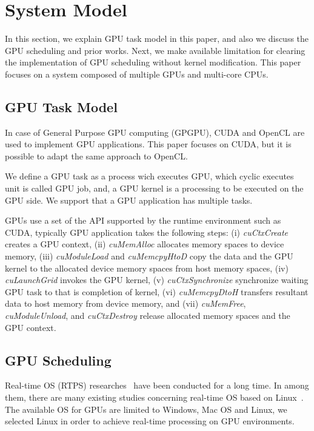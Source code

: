 \section{System Model}\label{sec:system_model}
In this section, we explain GPU task model in this paper, and also we discuss the GPU scheduling and prior works.
Next, we make available limitation for clearing the implementation of GPU scheduling without kernel modification.
This paper focuses on a system composed of multiple GPUs and multi-core CPUs.

\subsection{GPU Task Model}
In case of General Purpose GPU computing (GPGPU), CUDA and OpenCL are used to implement GPU applications.
This paper focuses on CUDA, but it is possible to adapt the same approach to OpenCL.

We define a GPU task as a process wich executes GPU,
which cyclic executes unit is called GPU job,
and, a GPU kernel is a processing to be executed on the GPU side.
We support that a GPU application has multiple tasks.

GPUs use a set of the API supported by the runtime environment such as CUDA,
typically GPU application takes the following steps:
(i) \textit{cuCtxCreate} creates a GPU context,
(ii) \textit{cuMemAlloc} allocates memory spaces to device memory, 
(iii) \textit{cuModuleLoad} and \textit{cuMemcpyHtoD} copy the data and the GPU kernel to the allocated device memory spaces from host memory spaces,
(iv) \textit{cuLaunchGrid} invokes the GPU kernel, 
(v) \textit{cuCtxSynchronize} synchronize waiting GPU task to that is completion of kernel, 
(vi) \textit{cuMemcpyDtoH} transfers resultant data to host memory from device memory, and
(vii) \textit{cuMemFree}, \textit{cuModuleUnload}, and \textit{cuCtxDestroy} release allocated memory spaces and the GPU context.



\subsection{GPU Scheduling}
Real-time OS (RTPS) researches~\cite{spring,readline,itron,rk} have been conducted for a long time.
In among them, there are many existing studies concerning real-time OS based on Linux~\cite{litmus,prk,rtai,yodaiken1999rtlinux,kato2009loadable}.
The available OS for GPUs are limited to Windows, Mac OS and Linux,
we selected Linux in order to achieve real-time processing on GPU environments.

